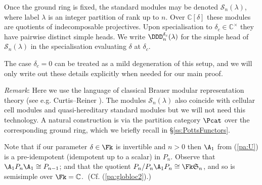 \documentclass[reqno,10pt,a4paper]{amsart}
\newcommand{\C}{\mathbb{C}}
\newcommand{\ppmx}[1]{}
\newcommand{\Sym}{\mathfrak{S}}
\newcommand{\cell}{\mathcal{S}}
\newcommand{\SSS}{\mathcal{S}} %
\newcommand{\confer}[1]{$\;$(Cf. (#1).)}  %
\begin{document}

Once the ground ring is fixed, the standard modules may be 
denoted $\SSS_n(\lambda)$, where label $\lambda$ is an integer partition of rank up to $n$.
Over $\C[\delta]$ these modules are quotients of indecomposable projectives.
Upon specialisation to $\delta_c \in \C^\times$ they have  %
pairwise distinct simple heads.
We write $\DDD_n^{\delta_c}(\lambda)$ for the simple head of $\SSS_n(\lambda)$  in the specialisation evaluating $\delta$ at $\delta_c$. 

The case $\delta_c =0$ can be treated as a mild degeneration of this setup, and we will only write out these details explicitly when needed for our main proof. 


\medskip 

{\it{Remark}}: Here we use the language of classical Brauer modular representation theory (see e.g. Curtis--Reiner \cite[\S 18]{CurtisReiner62}). 
The modules $\SSS_n(\lambda)$ 
also coincide with cellular cell modules and quasi-hereditary standard modules but we will not need this technology.
A natural construction is via the partition category $\Pcat$ 
over the corresponding ground ring, which we briefly recall in \S\ref{ss:PottsFunctors}.


\ppmx{[could perhaps put \ref{pa:globloc101} here for example. Done.]}







\mdef   \label{pa:globloc101}
\ppmx{[before, we had the rep theory we need demoted to the start of sec.\ref{ss:review}. but now we are putting some of it here (15/8/24: now moved to sec.3) - so that we can parallel the index set setup when we come to the $P^2$ story below. maybe we should therefore move more of it from sec.\ref{ss:review} to here? or otherwise move the corresponding bit for $P^2$ to later?]}
Note that if 
our parameter 
$\delta \in \Fk$ is invertible 
and $n>0$ 
then $\A_1$ 
from (\ref{pa:U}) 
is a pre-idempotent 
(idempotent up to a scalar)
in $P_n$. 
Observe 
that 
$\A_1 P_n \A_1 \cong P_{n-1}$; and that the quotient 
$P_n/ P_n \A_1 P_n \cong \Fk \Sym_n$,
and so is semisimple over $\Fk = \C$. 
\confer{\ref{pa:globloc2}}
\end{document}
